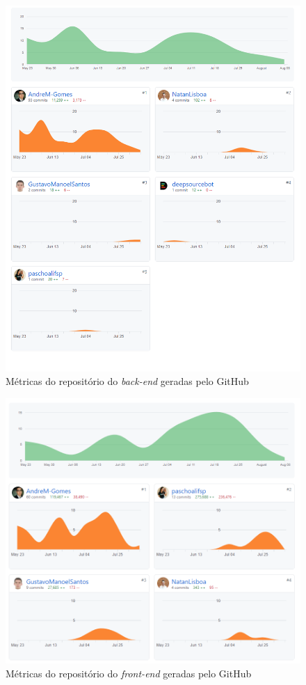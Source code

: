 \begin{figure}[htb]
    \centering
	\includegraphics[width=16cm]{imagens/MetricasGitBack.png}
	\caption{\label{git-backend} Métricas do repositório do \textit{back-end} geradas pelo GitHub}
\end{figure}
\FloatBarrier


\begin{figure}[htb]
    \centering
	\includegraphics[width=16cm]{imagens/MetricasGitFront.png}
	\caption{\label{git-frontend} Métricas do repositório do \textit{front-end} geradas pelo GitHub}
\end{figure}
\FloatBarrier

